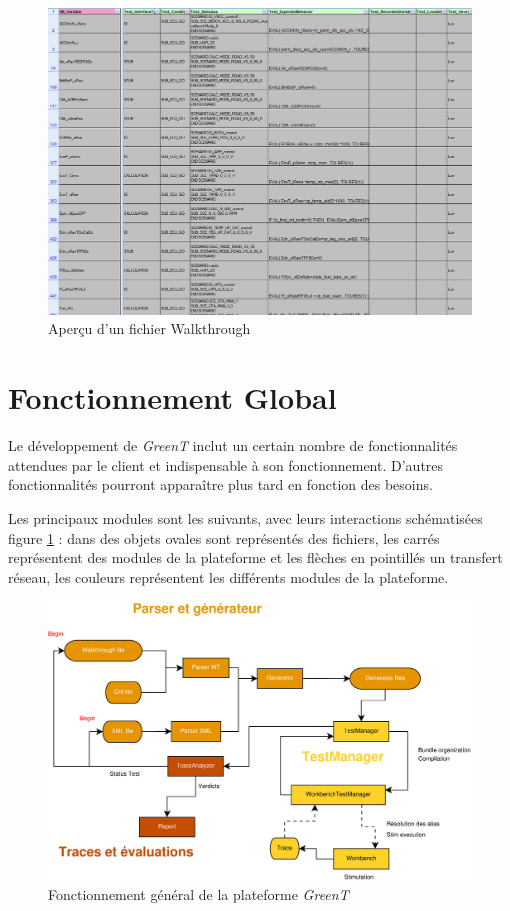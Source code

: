 \begin{figure}[H]
	\hspace{-35px}
	\includegraphics[width=20cm]{contents/images/walkthrough.png}
	\caption{Aperçu d'un fichier Walkthrough}
\end{figure}

\section{Fonctionnement Global}
Le développement de \textit{GreenT} inclut un certain nombre de fonctionnalités attendues par le client et indispensable à son fonctionnement. D'autres fonctionnalités pourront apparaître plus tard en fonction des besoins.

Les principaux modules sont les suivants, avec leurs interactions schématisées figure \ref{fig:generalDiag} : 
dans des objets ovales sont représentés des fichiers, les carrés représentent des modules de la plateforme et les flèches en pointillés un transfert réseau, les couleurs représentent les différents modules de la plateforme.

\begin{figure}[H]
	\hspace{-25px}
	\includegraphics[width=20cm]{contents/images/generalDiag.eps}
	\caption{Fonctionnement général de la plateforme \textit{GreenT}}
	\label{fig:generalDiag}
\end{figure}	

